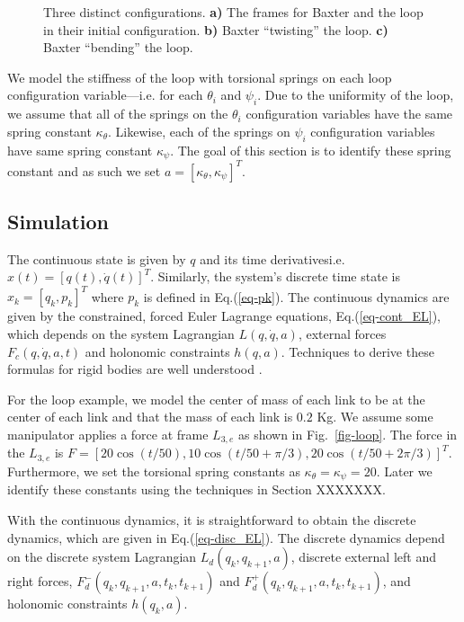 \documentclass[letterpaper, 10pt, conference]{ieeeconf}
\begin{document}
\begin{figure*}
\centering
\def\svgwidth{.97\textwidth}

\caption{Three distinct configurations.  \textbf{a)} The frames for Baxter and the loop in their initial configuration. \textbf{b)} Baxter ``twisting'' the loop. \textbf{c)} Baxter ``bending'' the loop.}
\label{fig-3bloops}
\end{figure*}

We model the stiffness of the loop with torsional springs on each loop configuration variable---i.e. for each $\theta_i$ and $\psi_i$.  Due to the uniformity of the loop, we assume that all of the springs on the $\theta_i$ configuration variables have the same spring constant $\kappa_{\theta}$.  Likewise, each of the springs on $\psi_i$ configuration variables have same spring constant $\kappa_{\psi}$.  The goal of this section is to identify these spring constant and as such we set $a = [\kappa_{\theta}, \kappa_{\psi}]^T$.  

\subsection{Simulation}
The continuous state is given by $q$ and its time derivatives\textemdash i.e. $x(t) = [q(t),\dot{q}(t)]^T$.  Similarly, the system's discrete time state is $x_k = [q_k,p_k]^T$ where $p_k$ is defined in Eq.(\ref{eq-pk}).   The continuous dynamics are given by the constrained, forced Euler Lagrange equations, Eq.(\ref{eq-cont_EL}), which depends on the system Lagrangian $L(q,\dot{q},a)$, external forces $F_c(q,\dot{q},a,t)$ and holonomic constraints $h(q,a)$. Techniques to derive these formulas for rigid bodies are well understood \cite{murray_li_sastry}.  

For the loop example, we model the center of mass of each link to be at the center of each link and that the mass of each link is $0.2$ Kg.  We assume some manipulator applies a force at frame $L_{3,e}$ as shown in Fig.~\ref{fig-loop}.  The force in the $L_{3,e}$ is $F = [20 \cos(t/50), 10 \cos(t/50 + \pi/3), 20 \cos(t/50 + 2\pi/3)]^T$.  Furthermore, we set the torsional spring constants as $\kappa_\theta = \kappa_\psi = 20$.  Later we identify these constants using the techniques in Section XXXXXXX.  

With the continuous dynamics, it is straightforward to obtain the discrete dynamics, which are given in Eq.(\ref{eq-disc_EL}).  The discrete dynamics depend on the discrete system Lagrangian $L_d(q_{k},q_{k+1},a)$, discrete external left and right forces, $F_d^-(q_{k},q_{k+1},a,t_k,t_{k+1})$ and $F_d^+(q_{k},q_{k+1},a,t_k,t_{k+1})$, and holonomic constraints $h(q_k,a)$.  
\end{document}
